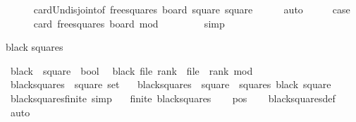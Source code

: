 \begin{isabellebody}
\ \ \ \ \isamarkupfalse%
\ card{\isacharunderscore}Un{\isacharunderscore}disjoint{\isacharbrackleft}of\ {\isachardoublequoteopen}free{\isacharunderscore}squares\ board{\isacharprime}{\isacharprime}{\isachardoublequoteclose}\ {\isachardoublequoteopen}{\isacharbraceleft}square{\isacharcomma}\ square{\isacharprime}{\isacharbraceright}{\isachardoublequoteclose}{\isacharbrackright}\isanewline
\ \ \ \ \isamarkupfalse%
\ auto\isanewline
\ \ \isamarkupfalse%
\ \isamarkupfalse%
\ {\isacharquery}case\isanewline
\ \ \ \ \isamarkupfalse%
\ {\isacharbackquoteopen}card\ {\isacharparenleft}free{\isacharunderscore}squares\ board{\isacharparenright}\ mod\ {}\ {\isacharequal}\ {}{\isacharbackquoteclose}\isanewline
\ \ \ \ \isamarkupfalse%
\ simp\isanewline
{}\isamarkupfalse%
%
\endisatagproof
{\isafoldproof}%
%
\isadelimproof
%
\endisadelimproof
%
\begin{isamarkuptext}%
black squares%
\end{isamarkuptext}\isamarkuptrue%
\isamarkupfalse%
\ black\ {\isacharcolon}{\isacharcolon}\ {\isachardoublequoteopen}square\ {\isasymRightarrow}\ bool{\isachardoublequoteclose}\ \isanewline
\ {\isachardoublequoteopen}black\ {\isacharparenleft}file{\isacharcomma}\ rank{\isacharparenright}\ {\isasymlongleftrightarrow}\ {\isacharparenleft}file\ {\isacharplus}\ rank{\isacharparenright}\ mod\ {}\ {\isacharequal}\ {}{\isachardoublequoteclose}\isanewline
\isanewline
{}\isamarkupfalse%
\ black{\isacharunderscore}squares\ {\isacharcolon}{\isacharcolon}\ {\isachardoublequoteopen}square\ set{\isachardoublequoteclose}\ \isanewline
\ \ {\isachardoublequoteopen}black{\isacharunderscore}squares\ {\isacharequal}\ {\isacharbraceleft}square\ {\isasymin}\ squares{\isachardot}\ black\ square{\isacharbraceright}{\isachardoublequoteclose}\isanewline
\isanewline
{}\isamarkupfalse%
\ black{\isacharunderscore}squares{\isacharunderscore}finite\ {\isacharbrackleft}simp{\isacharbrackright}{\isacharcolon}\isanewline
\ \ \ {\isachardoublequoteopen}finite\ black{\isacharunderscore}squares{\isachardoublequoteclose}\isanewline
%
\isadelimproof
\ \ %
\endisadelimproof
%
\isatagproof
{}\isamarkupfalse%
\ pos\isanewline
\ \ \isamarkupfalse%
\ black{\isacharunderscore}squares{\isacharunderscore}def\isanewline
\ \ \isamarkupfalse%
\ auto%

\end{isabellebody}
